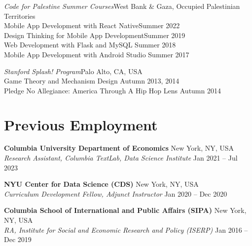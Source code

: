 \documentclass[letterpaper,11pt]{article}
\newcommand{\emplitemsep}{3mm}
\begin{document}
\textit{Code for Palestine Summer Courses}\hfill West Bank \& Gaza, Occupied Palestinian Territories\vspace{2mm}\\
Mobile App Development with React Native\hfill Summer 2022\vspace{1mm}\\
Design Thinking for Mobile App Development\hfill Summer 2019\vspace{1mm}\\
Web Development with Flask and MySQL \hfill Summer 2018\vspace{1mm}\\
Mobile App Development with Android Studio \hfill Summer 2017\vspace{2mm}\\

\begin{minipage}{\linewidth}
\vspace{2mm}\textit{Stanford Splash! Program}\hfill Palo Alto, CA, USA\vspace{2mm}\\
Game Theory and Mechanism Design \hfill Autumn 2013, 2014\vspace{1mm}\\
Pledge No Allegiance: America Through A Hip Hop Lens \hfill Autumn 2014\\

\end{minipage}

\section{Previous Employment}


	\textbf{Columbia University Department of Economics} \hfill{} New York, NY, USA\\%
	\textsl{\small Research Assistant, Columbia TextLab, Data Science Institute} \hfill{} {\small Jan 2021 -- Jul 2023}%
    \vspace{\emplitemsep}


	\textbf{NYU Center for Data Science (CDS)} \hfill{} New York, NY, USA\\%
	\textsl{\small Curriculum Development Fellow, Adjunct Instructor} \hfill{} {\small Jan 2020 -- Dec 2020}%
    \vspace{\emplitemsep}


	\textbf{Columbia School of International and Public Affairs (SIPA)} \hfill{} New York, NY, USA\\%
	\textsl{\small RA, Institute for Social and Economic Research and Policy (ISERP)} \hfill{} {\small Jan 2016 -- Dec 2019}%
    \vspace{\emplitemsep}
\end{document}

